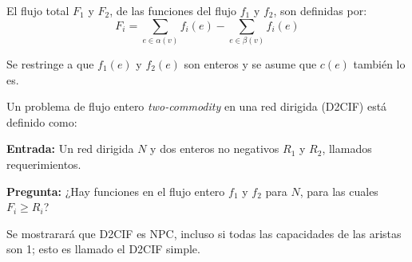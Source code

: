 \documentclass[12pt,letterpaper]{article}
\begin{document}
El flujo total $F_1$ y $F_2$, de las funciones del flujo $f_1$ y $f_2$, son definidas por:
$$  F_i = \sum_{e \in \alpha(v)} f_i(e) - \sum_{e \in \beta(v)} f_i(e)  $$

Se restringe a que $f_1(e)$ y $f_2(e)$ son enteros y se asume que $c(e)$ también lo es.

Un problema de flujo entero \textit{two-commodity} en una red dirigida (D2CIF) está
definido como:

\bigbreak

\textbf{Entrada:} Un red dirigida $N$ y dos enteros no negativos $R_1$ y $R_2$, llamados
requerimientos.

\bigbreak

\textbf{Pregunta:} ¿Hay funciones en el flujo entero $f_1$ y $f_2$ para $N$, para las
cuales $F_i \geq R_i$?

\bigbreak

Se mostrarará que D2CIF es NPC, incluso si todas las capacidades de las aristas son 1;
esto es llamado el D2CIF simple.
\end{document}
